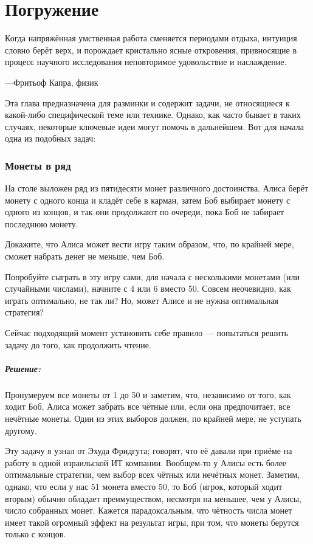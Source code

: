 \chapter*{Погружение} 

\setlength{\epigraphwidth}{.8\textwidth}
\epigraph{Когда напряжённая умственная работа сменяется периодами отдыха, интуиция словно берёт верх, и порождает кристально ясные откровения, привносящие в процесс научного исследования неповторимое удовольствие и наслаждение.}{---Фритьоф Капра, физик}

Эта глава предназначена для разминки и содержит задачи, не относящиеся к какой-либо специфической теме или технике.
Однако, как часто бывает в таких случаях, некоторые ключевые идеи могут помочь в дальнейшем.
 Вот для начала одна из подобных задач:

\subsection*{Монеты в ряд} %

На столе выложен ряд из пятидесяти монет различного достоинства.
Алиса берёт монету с одного конца и кладёт себе в карман, затем Боб выбирает монету с одного из концов, и так они продолжают по очереди, пока Боб не забирает последнюю монету.

Докажите, что Алиса может вести игру таким образом, что, по крайней мере, сможет набрать денег не меньше, чем Боб.

\medskip

Попробуйте сыграть в эту игру сами, для начала с несколькими монетами (или случайными числами), начните с 4 или 6 вместо 50.
Совсем неочевидно, как играть оптимально, не так ли?
Но, может Алисе и не нужна оптимальная стратегия? 

Сейчас подходящий момент установить себе правило --- попытаться решить задачу до того, как продолжить чтение.

\paragraph{Решение:}
Пронумеруем все монеты от 1 до 50 и заметим, что, независимо от того, как ходит Боб, Алиса может забрать все чётные или, если она предпочитает, все нечётные монеты.
Один из этих выборов должен, по крайней мере, не уступать другому.
\heart

Эту задачу я узнал от Эхуда Фридгута;
говорят, что её давали при приёме на работу в одной израильской ИТ компании.
Вообщем-то у Алисы есть более оптимальные стратегии, чем выбор всех чётных или нечётных монет.
Заметим, однако, что если у нас 51 монета вместо 50, то Боб (игрок, который ходит вторым) обычно обладает преимуществом, несмотря на меньшее, чем у Алисы, число собранных монет.
Кажется парадоксальным, что чётность числа монет имеет такой огромный эффект на результат игры, при том, что монеты берутся только с концов.


